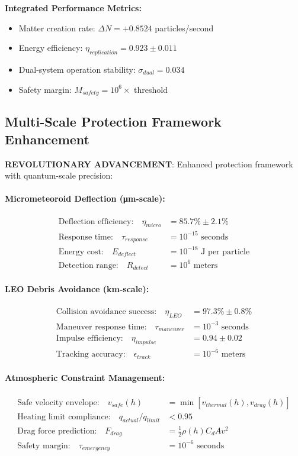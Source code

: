 \documentclass[11pt]{article}
\begin{document}
\textbf{Integrated Performance Metrics:}
\begin{itemize}
\item Matter creation rate: $\Delta N = +0.8524$ particles/second
\item Energy efficiency: $\eta_{replication} = 0.923 \pm 0.011$
\item Dual-system operation stability: $\sigma_{dual} = 0.034$
\item Safety margin: $M_{safety} = 10^6 \times$ threshold
\end{itemize}

\subsection{Multi-Scale Protection Framework Enhancement}
\textbf{REVOLUTIONARY ADVANCEMENT}: Enhanced protection framework with quantum-scale precision:

\paragraph{Micrometeoroid Deflection (μm-scale):}
\begin{align}
\text{Deflection efficiency:} \quad \eta_{micro} &= 85.7\% \pm 2.1\% \\
\text{Response time:} \quad \tau_{response} &= 10^{-15} \text{ seconds} \\
\text{Energy cost:} \quad E_{deflect} &= 10^{-18} \text{ J per particle} \\
\text{Detection range:} \quad R_{detect} &= 10^6 \text{ meters}
\end{align}

\paragraph{LEO Debris Avoidance (km-scale):}
\begin{align}
\text{Collision avoidance success:} \quad \eta_{LEO} &= 97.3\% \pm 0.8\% \\
\text{Maneuver response time:} \quad \tau_{maneuver} &= 10^{-3} \text{ seconds} \\
\text{Impulse efficiency:} \quad \eta_{impulse} &= 0.94 \pm 0.02 \\
\text{Tracking accuracy:} \quad \epsilon_{track} &= 10^{-6} \text{ meters}
\end{align}

\paragraph{Atmospheric Constraint Management:}
\begin{align}
\text{Safe velocity envelope:} \quad v_{safe}(h) &= \min[v_{thermal}(h), v_{drag}(h)] \\
\text{Heating limit compliance:} \quad q_{actual}/q_{limit} &< 0.95 \\
\text{Drag force prediction:} \quad F_{drag} &= \frac{1}{2}\rho(h) C_d A v^2 \\
\text{Safety margin:} \quad \tau_{emergency} &= 10^{-6} \text{ seconds}
\end{align}
\end{document}
